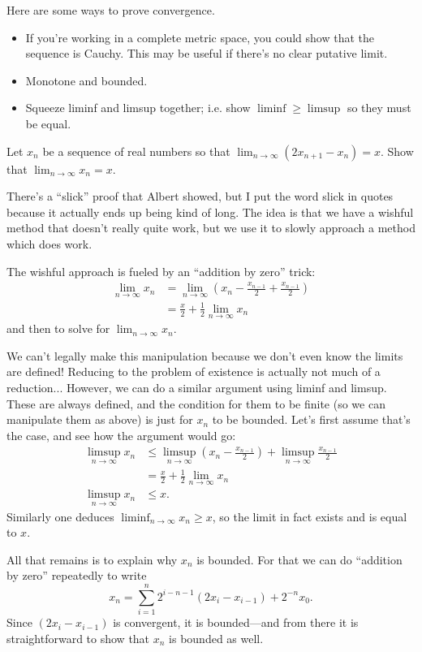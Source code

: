\begin{rem*}
	Here are some ways to prove convergence.
	\begin{itemize}
		\item If you're working in a complete metric space, you could show that the sequence is Cauchy. This may be useful if there's no clear putative limit.
		\item Monotone and bounded.
		\item Squeeze liminf and limsup together; i.e. show $\liminf \geq \limsup$ so they must be equal.
	\end{itemize}
\end{rem*}

\begin{problem}
	Let $x_n$ be a sequence of real numbers so that $\lim_{n\to \infty} (2x_{n+1} - x_n) = x$. Show that $\lim_{n\to\infty} x_n = x$.
\end{problem}
\begin{solution}[1]
	There's a ``slick'' proof that Albert showed, but I put the word slick in quotes because it actually ends up being kind of long. The idea is that we have a wishful method that doesn't really quite work, but we use it to slowly approach a method which does work.
	
	The wishful approach is fueled by an ``addition by zero'' trick:
	\begin{align*}
		\lim_{n\to\infty} x_n &= \lim_{n\to \infty} \left( x_n - \frac{x_{n-1}}{2} + \frac{x_{n-1}}{2}\right)\\
		&= \frac{x}{2} + \frac{1}{2} \lim_{n\to \infty} x_{n}
	\end{align*}
	and then to solve for $\lim_{n\to\infty} x_n$.
	
	We can't legally make this manipulation because we don't even know the limits are defined! Reducing to the problem of existence is actually not much of a reduction... However, we can do a similar argument using liminf and limsup. These are always defined, and the condition for them to be finite (so we can manipulate them as above) is just for $x_{n}$ to be bounded. Let's first assume that's the case, and see how the argument would go:
	\begin{align*}
		\limsup_{n\to\infty} x_n &\leq \limsup_{n\to \infty} \left( x_n - \frac{x_{n-1}}{2} \right) + \limsup_{n\to \infty}\frac{x_{n-1}}{2}\\
		&= \frac{x}{2} + \frac{1}{2} \lim_{n\to \infty} x_{n}\\
		\limsup_{n\to \infty} x_n &\leq x.
	\end{align*}
	Similarly one deduces $\liminf_{n\to\infty} x_n \geq x$, so the limit in fact exists and is equal to $x$.
	
	All that remains is to explain why $x_n$ is bounded. For that we can do ``addition by zero'' repeatedly to write
	\[
		x_n = \sum_{i=1}^n 2^{i-n-1}\left(2x_i - x_{i-1}\right) + 2^{-n} x_0.
	\]
	Since $(2x_i - x_{i-1})$ is convergent, it is bounded---and from there it is straightforward to show that $x_n$ is bounded as well.
\end{solution}
